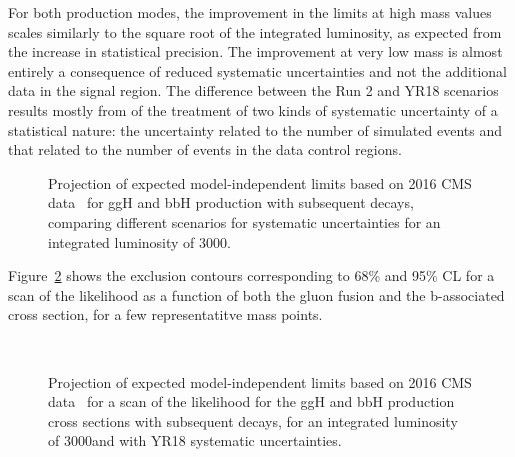 For both production modes, 
the improvement in the limits at high mass values
scales similarly to the square root of the integrated luminosity,
as expected from the increase in statistical precision.
The improvement at very low mass is almost entirely a consequence of reduced systematic uncertainties
and not the additional data in the signal region. 
The difference between the Run 2 and YR18 scenarios results mostly from of the treatment 
of two kinds of systematic uncertainty of a statistical nature: 
the uncertainty related to the number of simulated events 
and that related to the number 
of events in the data control regions.
%
\begin{figure}[htbp]
\begin{center}
\end{center}
\caption{Projection of expected model-independent limits based on 2016 CMS data~\cite{HIG-17-020} 
for ggH and bbH production with subsequent \htt decays, comparing different 
scenarios for systematic uncertainties for an integrated luminosity of 3000\fbinv.}
\label{fig:model_indep2}
\end{figure}

Figure~\ref{fig:model_indep2d}  shows the exclusion contours corresponding to 68\% and 95\% CL for a scan of the likelihood as a function of both the gluon fusion and the b-associated cross section, for a few representatitve mass points.
%
\begin{figure}[htbp]
\begin{center}
\\
\end{center}
\caption{Projection of expected model-independent limits based on 2016 CMS data~\cite{HIG-17-020} for a scan of the likelihood for the ggH and bbH production cross sections with subsequent \htt decays, 
for an integrated luminosity of 3000\fbinv and with YR18 systematic uncertainties.}
\label{fig:model_indep2d}
\end{figure}

